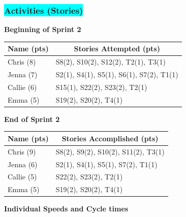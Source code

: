 \subsubsection{\colorbox{cyan}{Activities (Stories)}}

\textbf{Beginning of Sprint 2}

\begin{table}[!hbt]
\begin{tabular}{|l|l|}
\hline
\multicolumn{1}{|c|}{\textbf{Name (pts)}} & \multicolumn{1}{c|}{\textbf{Stories Attempted (pts)}} \\ \hline
Chris (8)  & S8(2), S10(2), S12(2), T2(1), T3(1)       \\ \hline
Jenna (7)  & S2(1), S4(1), S5(1), S6(1), S7(2), T1(1) \\ \hline
Callie (6) & S15(1), S22(2), S23(2), T2(1)              \\ \hline
Emma (5)   & S19(2), S20(2), T4(1)               \\ \hline
\end{tabular}
\end{table}

\noindent \textbf{End of Sprint 2}

\begin{table}[!hbt]
\begin{tabular}{|l|l|}
\hline
\multicolumn{1}{|c|}{\textbf{Name (pts)}} & \multicolumn{1}{c|}{\textbf{Stories Accomplished (pts)}} \\ \hline
Chris (9)  & S8(2), S9(2), S10(2), S11(2), T3(1) \\ \hline
Jenna (6)  & S2(1), S4(1), S5(1), S7(2), T1(1)   \\ \hline
Callie (5) & S22(2), S23(2), T2(1)             \\ \hline
Emma (5)   & S19(2), S20(2), T4(1)         \\ \hline
\end{tabular}
\end{table}

\pagebreak

\noindent \textbf{Individual Speeds and Cycle times}

